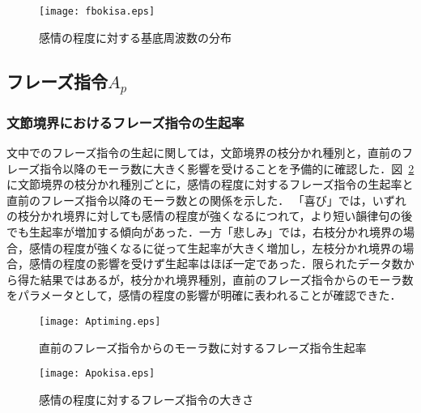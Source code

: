 \documentclass[japanese]{jnlp_1.3b}
\begin{document}
\begin{figure}[t]
\begin{center}
    \texttt{[image: fbokisa.eps]}
\end{center}
\caption{感情の程度に対する基底周波数の分布}
\label{Fbkekka}
\end{figure}

\subsection{フレーズ指令$A_p$}\label{Ap}
\subsubsection{文節境界におけるフレーズ指令の生起率}
文中でのフレーズ指令の生起に関しては，文節境界の枝分かれ種別と，直前のフレーズ指令以降のモーラ数に大きく影響を受けることを予備的に確認した．図~\ref{kekka-1}に文節境界の枝分かれ種別ごとに，感情の程度に対するフレーズ指令の生起率と直前のフレーズ指令以降のモーラ数との関係を示した．
「喜び」では，いずれの枝分かれ境界に対しても感情の程度が強くなるにつれて，より短い韻律句の後でも生起率が増加する傾向があった．一方「悲しみ」では，右枝分かれ境界の場合，感情の程度が強くなるに従って生起率が大きく増加し，左枝分かれ境界の場合，感情の程度の影響を受けず生起率はほぼ一定であった．限られたデータ数から得た結果ではあるが，枝分かれ境界種別，直前のフレーズ指令からのモーラ数をパラメータとして，感情の程度の影響が明確に表われることが確認できた．

\begin{figure}[t]
\begin{center}
    \texttt{[image: Aptiming.eps]}
\end{center}
\caption{直前のフレーズ指令からのモーラ数に対するフレーズ指令生起率}
\label{kekka-1}
\end{figure}

\begin{figure}[t]
\begin{center}
    \texttt{[image: Apokisa.eps]}
\end{center}
\caption{感情の程度に対するフレーズ指令の大きさ}
\label{kekka-3}
\end{figure}
\end{document}
